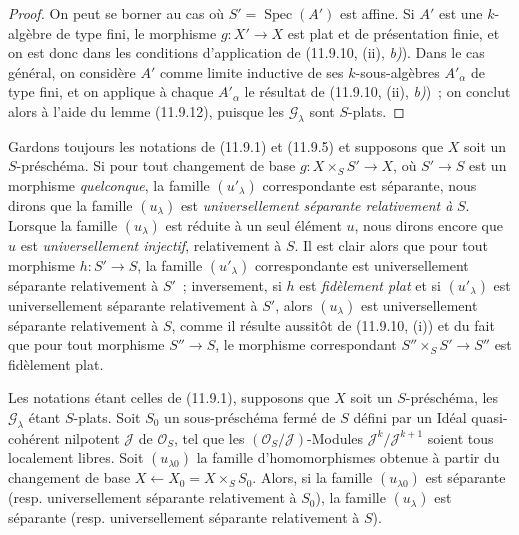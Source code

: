 \begin{proof}
On peut se borner au cas où $S'=\operatorname{Spec}(A')$ est affine. Si $A'$
est une $k$-algèbre de type fini, le morphisme $g:X'\to X$ est plat et de
présentation finie, et on est donc dans les conditions d'application de
(11.9.10, (ii), \emph{b)}). Dans le cas général, on considère $A'$ comme limite
inductive de ses $k$-sous-algèbres $A'_\alpha$ de type fini, et on applique à
chaque $A'_\alpha$ le résultat de (11.9.10, (ii), \emph{b)})~; on conclut alors à
l'aide du lemme (11.9.12), puisque les $\mathcal G_\lambda$ sont $S$-plats.
\end{proof}

\begin{env}[11.9.14]
\label{IV.11.9.14-fr}
Gardons toujours les notations de (11.9.1) et (11.9.5) et supposons que $X$
soit un $S$-préschéma. Si pour tout changement de base
$g:X\times_S S'\to X$, où $S'\to S$ est un morphisme \emph{quelconque}, la famille
$(u'_\lambda)$ correspondante est séparante, nous dirons que la famille
$(u_\lambda)$ est \emph{universellement séparante relativement à} $S$.
Lorsque la famille $(u_\lambda)$ est réduite à un seul élément $u$, nous
dirons encore que $u$ est \emph{universellement injectif}, relativement à
$S$. Il est clair alors que pour tout morphisme $h:S'\to S$, la famille
$(u'_\lambda)$ correspondante est universellement séparante relativement à
$S'$~; inversement, si $h$ est \emph{fidèlement plat} et si $(u'_\lambda)$ est
universellement séparante relativement à $S'$, alors $(u_\lambda)$ est
universellement séparante relativement à $S$, comme il résulte aussitôt de
(11.9.10, (i)) et du fait que pour tout morphisme $S''\to S$, le morphisme
correspondant $S''\times_S S'\to S''$ est fidèlement plat.
\end{env}


\begin{proposition}[11.9.15]
\label{IV.11.9.15-fr}
Les notations étant celles de \textup{(11.9.1)}, supposons que $X$ soit un
$S$-préschéma, les $\mathcal G_\lambda$ étant $S$-plats. Soit $S_0$ un
sous-préschéma fermé de $S$ défini par un Idéal quasi-cohérent nilpotent
$\mathcal J$ de $\mathcal O_S$, tel que les
$(\mathcal O_S/\mathcal J)$-Modules $\mathcal J^k/\mathcal J^{k+1}$ soient
tous localement libres. Soit $(u_{\lambda0})$ la famille d'homomorphismes
obtenue à partir du changement de base
$X\leftarrow X_0=X\times_S S_0$. Alors, si la famille $(u_{\lambda0})$ est
séparante \textup{(resp.} universellement séparante relativement à $S_0$\textup{)}, la famille
$(u_\lambda)$ est séparante \textup{(resp.} universellement séparante relativement à
$S$\textup{)}.
\end{proposition}

